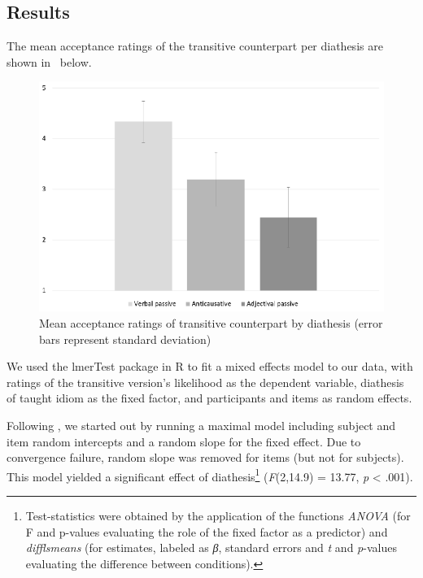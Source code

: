 \documentclass[output=paper]{langsci/langscibook}
\begin{document}
\subsection{Results}  %

The mean acceptance ratings of the transitive counterpart per diathesis are
shown in~ below.

\begin{figure}

    \centering
    \caption{Mean acceptance ratings of transitive counterpart by diathesis
    (error bars represent standard deviation)}\label{fig:key:20.2}

    \includegraphics[width=.9\textwidth]{./img/20.2.eps}

\end{figure}

We used the lmerTest package in R \parencite{Kuzetal2015} to fit a mixed
effects model to our data, with ratings of the transitive version’s likelihood
as the dependent variable, diathesis of taught idiom as the fixed factor, and
participants and items as random effects.

Following \citet{Barretal2013}, we started out by running a maximal model
including subject and item random intercepts and a random slope for the fixed
effect. Due to convergence failure, random slope was removed for items (but not
for subjects). This model yielded a significant effect of
diathesis\footnote{Test-statistics were obtained by the application of the
    functions \emph{ANOVA} (for F and p-values evaluating the role of the fixed
    factor as a predictor) and \emph{difflsmeans} (for estimates, labeled as
\emph{β}, standard errors and \emph{t} and \emph{p}-values evaluating the
difference between conditions).} (\emph{F}(2,14.9) = 13.77, \emph{p} < .001).
\end{document}
